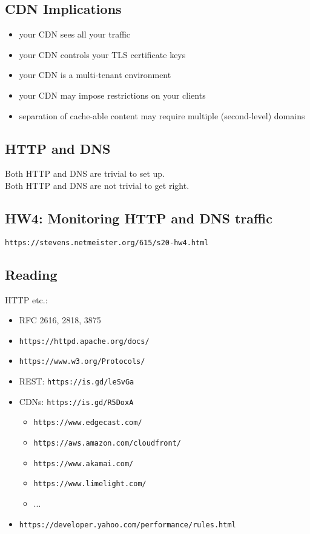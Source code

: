 \documentclass[xga]{xdvislides}
\begin{document}
\subsection{CDN Implications}
\begin{itemize}
	\item your CDN sees all your traffic
	\item your CDN controls your TLS certificate keys
	\item your CDN is a multi-tenant environment
	\item your CDN may impose restrictions on your clients
	\item separation of cache-able content may
		require multiple (second-level) domains
\end{itemize}

\subsection{HTTP and DNS}
\vspace*{\fill}
\Huge
Both HTTP and DNS are trivial to set up. \\

Both HTTP and DNS are not trivial to get right. \\
\Normalsize
\vspace*{\fill}

\subsection{HW4: Monitoring HTTP and DNS traffic}
\verb+https://stevens.netmeister.org/615/s20-hw4.html+


\subsection{Reading}
HTTP etc.:
\begin{itemize}
	\item RFC 2616, 2818, 3875
	\item \verb+https://httpd.apache.org/docs/+
	\item \verb+https://www.w3.org/Protocols/+
	\item REST: \verb+https://is.gd/leSvGa+
	\item CDNs: \verb+https://is.gd/R5DoxA+
		\begin{itemize}
			\item \verb+https://www.edgecast.com/+
			\item \verb+https://aws.amazon.com/cloudfront/+
			\item \verb+https://www.akamai.com/+
			\item \verb+https://www.limelight.com/+
			\item ...
		\end{itemize}
	\item \verb+https://developer.yahoo.com/performance/rules.html+
\end{itemize}
\end{document}
